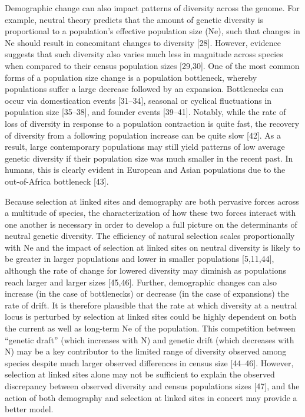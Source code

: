 \documentclass[9pt,twocolumn,twoside]{rilabRxiv}
\begin{document}
Demographic change can also impact patterns of diversity across the genome. 
For example, neutral theory predicts that the amount of genetic diversity is proportional to a population’s effective population size (Ne), such that changes in Ne should result in concomitant changes to diversity [28]. 
However, evidence suggests that such diversity also varies much less in magnitude across species when compared to their census population sizes [29,30]. 
One of the most common forms of a population size change is a population bottleneck, whereby populations suffer a large decrease followed by an expansion. 
Bottlenecks can occur via domestication events [31–34], seasonal or cyclical fluctuations in population size [35–38], and founder events [39–41]. 
Notably, while the rate of loss of diversity in response to a population contraction is quite fast, the recovery of diversity from a following population increase can be quite slow [42]. 
As a result,  large contemporary populations may still yield patterns of low average genetic diversity if their population size was much smaller in the recent past. 
In humans, this is clearly evident in European and Asian populations due to the out-of-Africa bottleneck [43].

Because selection at linked sites and demography are both pervasive forces across a multitude of species, the characterization of how these two forces interact with one another is necessary in order to develop a full picture on the determinants of neutral genetic diversity.
The efficiency of natural selection scales proportionally with Ne and the impact of selection at linked sites on neutral diversity is likely to be greater in larger populations and lower in smaller populations [5,11,44], although the rate of change for lowered diversity may diminish as populations reach larger and larger sizes [45,46]. 
Further, demographic changes can also increase (in the case of bottlenecks) or decrease (in the case of expansions) the rate of drift. 
It is therefore plausible that the rate at which diversity at a neutral locus is perturbed by selection at linked sites could be highly dependent on both the current as well as long-term Ne of the population. 
This competition between “genetic draft” (which increases with N) and genetic drift (which decreases with N) may be a key contributor to the limited range of diversity observed among species  despite much larger observed differences in census size [44–46]. 
However, selection at linked sites alone may not be sufficient to explain the observed discrepancy between observed diversity and census populations sizes [47], and the action of both demography and selection at linked sites in concert may provide a better model.   
\end{document}
